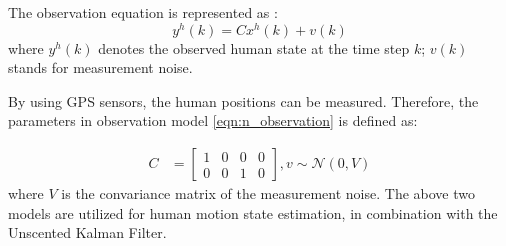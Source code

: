 \documentclass[letterpaper, 10 pt, conference]{ieeeconf}
\begin{document}
	
	
	
	\addtocounter{equation}{-2}
	
	The observation equation is represented as : 
	\small\begin{equation}
		y^h(k)=Cx^h(k)+v(k)\label{eqn:n_observation}
	\end{equation}\normalsize
	where $y^h(k)$ denotes the observed human state at the time step $k$; $v(k)$ stands for measurement noise. 
	
	By using GPS sensors, the human positions can be measured.
	Therefore, the parameters in observation model \cref{eqn:n_observation} is defined as:
	\addtocounter{equation}{-1}
	\small\begin{subequations}
		\begin{align*}
			C&=\left[
			\begin{array}{cccc}
				1& 0& 0& 0\\
				0& 0& 1& 0
			\end{array}\right],
			v\sim\mathcal{N}(0,V)
		\end{align*}
	\end{subequations}\normalsize
	where $V$ is the convariance matrix of the measurement noise.
	The above two models are utilized for human motion state estimation, in combination with the Unscented Kalman Filter.
	
	
\end{document}
